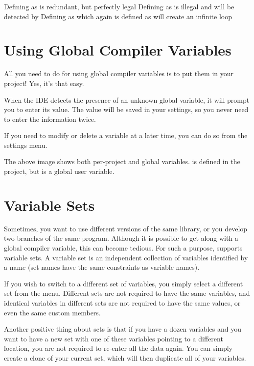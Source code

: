 
Defining  as  is redundant, but perfectly legal
Defining  as  is illegal and will be detected by \codeblocks
Defining  as  which again is defined as  will create an infinite loop

\section{Using Global Compiler Variables}

All you need to do for using global compiler variables is to put them in your project! Yes, it's that easy.

When the IDE detects the presence of an unknown global variable, it will prompt you to enter its value. The value will be saved in your settings, so you never need to enter the information twice.

If you need to modify or delete a variable at a later time, you can do so from the settings menu.




The above image shows both per-project and global variables.  is defined in the project, but  is a global user variable.

\section{Variable Sets}

Sometimes, you want to use different versions of the same library, or you develop two branches of the same program. Although it is possible to get along with a global compiler variable, this can become tedious. For such a purpose, \codeblocks supports variable sets. A variable set is an independent collection of variables identified by a name (set names have the same constraints as variable names).

If you wish to switch to a different set of variables, you simply select a different set from the menu. Different sets are not required to have the same variables, and identical variables in different sets are not required to have the same values, or even the same custom members.

Another positive thing about sets is that if you have a dozen variables and you want to have a new set with one of these variables pointing to a different location, you are not required to re-enter all the data again. You can simply create a clone of your current set, which will then duplicate all of your variables.

